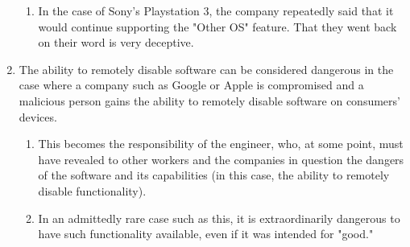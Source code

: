 \documentclass[12pt]{article}
\begin{document}
\begin{enumerate}
\begin{enumerate}
\item In the case of Sony's Playstation 3, the company repeatedly said that it would continue supporting the "Other OS" feature. That they went back on their word is very deceptive. \cite{sonyLawsuit2}
\end{enumerate}
\item The ability to remotely disable software can be considered dangerous in the case where a company such as Google or Apple is compromised and a malicious person gains the ability to remotely disable software on consumers' devices.
\begin{enumerate}
\item This becomes the responsibility of the engineer, who, at some point, must have revealed to other workers and the companies in question the dangers of the software and its capabilities (in this case, the ability to remotely disable functionality). \cite{secode}
\item In an admittedly rare case such as this, it is extraordinarily dangerous to have such functionality available, even if it was intended for "good."
\end{enumerate}
\end{enumerate}

\nocite{texTemp}
\nocite{BibTex}
\nocite{BibMang}
\nocite{bibStyle}




\end{document}
